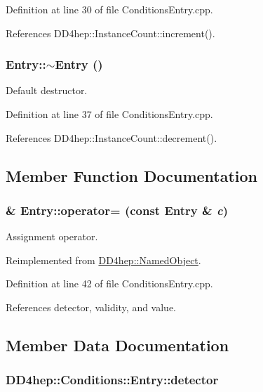 Definition at line 30 of file ConditionsEntry.cpp.

References DD4hep::InstanceCount::increment().\hypertarget{class_d_d4hep_1_1_conditions_1_1_entry_ace080276d727881acfee7197b85f0b65}{
\subsubsection[{$\sim$Entry}]{\setlength{\rightskip}{0pt plus 5cm}Entry::$\sim$Entry ()}}
\label{class_d_d4hep_1_1_conditions_1_1_entry_ace080276d727881acfee7197b85f0b65}


Default destructor. 

Definition at line 37 of file ConditionsEntry.cpp.

References DD4hep::InstanceCount::decrement().

\subsection{Member Function Documentation}
\hypertarget{class_d_d4hep_1_1_conditions_1_1_entry_a750c6f836c0cb9a0bb6975a8f1e9ee01}{
\subsubsection[{operator=}]{ \& Entry::operator= (const {\bf Entry} \& {\em c})}}
\label{class_d_d4hep_1_1_conditions_1_1_entry_a750c6f836c0cb9a0bb6975a8f1e9ee01}


Assignment operator. 

Reimplemented from \hyperlink{class_d_d4hep_1_1_named_object_a474ed41e8d8b480401671dfe07b33eb6}{DD4hep::NamedObject}.

Definition at line 42 of file ConditionsEntry.cpp.

References detector, validity, and value.

\subsection{Member Data Documentation}
\hypertarget{class_d_d4hep_1_1_conditions_1_1_entry_ae10613b25e5bc54df7d4ada0a2b774a9}{
\subsubsection[{detector}]{ {\bf DD4hep::Conditions::Entry::detector}}}
\label{class_d_d4hep_1_1_conditions_1_1_entry_ae10613b25e5bc54df7d4ada0a2b774a9}


